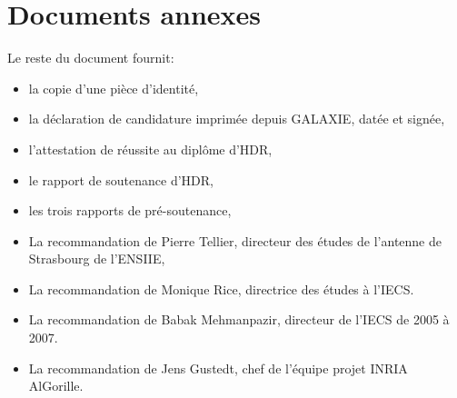 \documentclass[11pt]{article}
\begin{document}
%



\newpage
\section{Documents annexes}

Le reste du document fournit:\\
\begin{itemize}
\item la copie d'une pièce d'identité,
\item la déclaration de candidature imprimée depuis GALAXIE, datée et signée,
\item l'attestation de réussite au diplôme d'HDR,
\item le rapport de soutenance d'HDR,
\item les trois rapports de pré-soutenance,
\item La recommandation de Pierre Tellier, directeur des études de l'antenne de Strasbourg de l'ENSIIE,
\item La recommandation de Monique Rice, directrice des études à l'IECS.
\item La recommandation de Babak Mehmanpazir, directeur de l'IECS de 2005 à 2007.
\item La recommandation de Jens Gustedt, chef de l'équipe projet INRIA AlGorille. 
\end{itemize}
\end{document}
